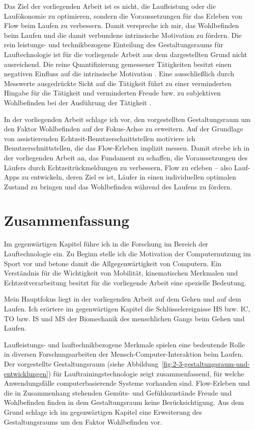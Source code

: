 Das Ziel der vorliegenden Arbeit ist es nicht, die Laufleistung oder die Laufökonomie zu optimieren, sondern die Voraussetzungen für das Erleben von Flow beim Laufen zu verbessern. Damit verspreche ich mir, das Wohlbefinden beim Laufen und die damit verbundene intrinsische Motivation zu fördern. Die rein leistungs- und technikbezogene Einteilung des Gestaltungsraums für Lauftechnologie ist für die vorliegende Arbeit aus dem dargestellten Grund nicht ausreichend. Die reine Quantifizierung gemessener Tätigkeiten besitzt einen negativen Einfluss auf die intrinsische Motivation \citep[vgl.][]{Etkin2016}. Eine ausschließlich durch Messwerte ausgedrückte Sicht auf die Tätigkeit führt zu einer verminderten Hingabe für die Tätigkeit und verminderten Freude bzw. zu subjektiven Wohlbefinden bei der Ausführung der Tätigkeit \citep[vgl.][]{Etkin2016}.

In der vorliegenden Arbeit schlage ich vor, den vorgestellten Gestaltungsraum um den Faktor Wohlbefinden auf der Fokus-Achse zu erweitern. Auf der Grundlage von assistierenden Echtzeit-Benutzerschnittstellen motiviere ich Benutzerschnittstellen, die das Flow-Erleben implizit messen. Damit strebe ich in der vorliegenden Arbeit an, das Fundament zu schaffen, die Voraussetzungen des Läufers durch Echtzeitrückmeldungen zu verbessern, Flow zu erleben -- also Lauf-Apps zu entwickeln, deren Ziel es ist, Läufer in einen individuellen optimalen Zustand zu bringen und das Wohlbefinden während des Laufens zu fördern.

\section{Zusammenfassung}
\label{sec:zusammenfassung-2}
Im gegenwärtigen Kapitel führe ich in die Forschung im Bereich der Lauftechnologie ein. Zu Beginn stelle ich die Motivation der Computernutzung im Sport vor und betone damit die Allgegenwärtigkeit von Computern. Ein Verständnis für die Wichtigkeit von Mobilität, kinematischen Merkmalen und Echtzeitverarbeitung besitzt für die vorliegende Arbeit eine spezielle Bedeutung.

Mein Hauptfokus liegt in der vorliegenden Arbeit auf dem Gehen und auf dem Laufen. Ich erörtere im gegenwärtigen Kapitel die Schlüsselereignisse \ac{HS} bzw. \ac{IC}, \ac{TO} bzw. \ac{IS} und MS der Biomechanik des menschlichen Gangs beim Gehen und Laufen.

Laufleistungs- und lauftechnikbezogene Merkmale spielen eine bedeutende Rolle in diversen Forschungsarbeiten der Mensch-Computer-Interaktion beim Laufen. Der vorgestellte Gestaltungsraum (siehe Abbildung~\ref{fig:2-3-gestaltungsraum-und-entwicklungen}) für Lauftrainingstechnologie zeigt zusammenfassend, für welche Anwendungsfälle computerbasierende Systeme vorhanden sind. Flow-Erleben und die in Zusammenhang stehenden Gemüts- und Gefühlszustände Freude und Wohlbefinden finden in dem Gestaltungsraum keine Berücksichtigung. Aus dem Grund schlage ich im gegenwärtigen Kapitel eine Erweiterung des Gestaltungsraums um den Faktor Wohlbefinden vor.

